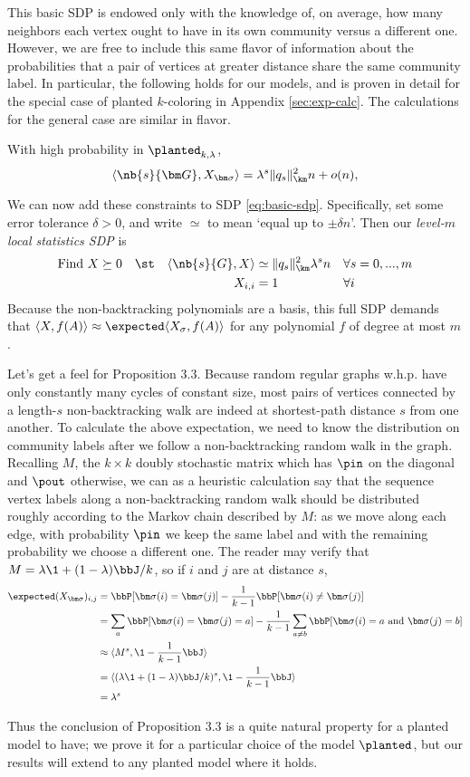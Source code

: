 This basic SDP is endowed only with the knowledge of, on average, how many neighbors each vertex ought to have in its own community versus a different one. However, we are free to include this same flavor of information about the probabilities that a pair of vertices at greater distance share the same community label. In particular, the following holds for our models, and is proven in detail for the special case of planted $k$-coloring in Appendix \ref{sec:exp-calc}.  The calculations for the general case are similar in flavor.
\begin{proposition} \label{prop:model}
    With high probability in $\planted_{k,\lambda}$, 
    $$
        \langle \nb{s}{\bm G},X_{\bm \sigma} \rangle = \lambda^s \|q_s\|^2_{\km} n + o(n),
    $$
\end{proposition}
We can now add these constraints to SDP \eqref{eq:basic-sdp}. Specifically, set some error tolerance $\delta>0$, and write $\simeq$ to mean `equal up to $\pm \delta n$'. Then our \emph{level-$m$ local statistics SDP} is
\begin{align} \label{eq:full-sdp}
    \text{Find  } X &\succeq 0 & &\st & \langle \nb{s}{G},X \rangle &\simeq \|q_s\|^2_{\km}\lambda^s n & & \forall s = 0,...,m \\
    & & & & X_{i,i} &= 1 & &\forall i \nonumber
\end{align}
Because the non-backtracking polynomials are a basis, this full SDP demands that $\langle X, f(A) \rangle \approx \expected\langle X_\sigma, f(A) \rangle$ for any polynomial $f$ of degree at most $m$.

Let's get a feel for Proposition 3.3. Because random regular graphs w.h.p. have only constantly many cycles of constant size, most pairs of vertices connected by a length-$s$ non-backtracking walk are indeed at shortest-path distance $s$ from one another. To calculate the above expectation, we need to know the distribution on community labels after we follow a non-backtracking random walk in the graph. Recalling $M$, the $k\times k$ doubly stochastic matrix which has $\pin$ on the diagonal and $\pout$ otherwise, we can as a heuristic calculation say that the sequence vertex labels along a non-backtracking random walk should be distributed roughly according to the Markov chain described by $M$: as we move along each edge, with probability $\pin$ we keep the same label and with the remaining probability we choose a different one. The reader may verify that $M = \lambda\1 + (1-\lambda)\bbJ/k$, so if $i$ and $j$ are at distance $s$,
\begin{align*}
    \expected (X_{\bm \sigma})_{i,j} 
    &= \bbP[\bm \sigma(i) = \bm \sigma(j)] - \frac{1}{k-1}\bbP[\bm \sigma(i) \neq \bm \sigma(j)] \\
    &= \sum_{a} \bbP[\bm \sigma(i) = \bm \sigma(j) = a] - \frac{1}{k-1}\sum_{a\neq b} \bbP[\bm \sigma(i) = a \text{ and } \bm \sigma(j) = b] \\
    &\approx \langle M^s, \1 - \frac{1}{k-1} \bbJ \rangle \\
    &= \langle(\lambda\1 + (1-\lambda)\bbJ/k)^s, \1 - \frac{1}{k-1} \bbJ\rangle \\
    &= \lambda^s
\end{align*}

\noindent Thus the conclusion of Proposition 3.3 is a quite natural property for a planted model to have; we prove it for a particular choice of the model $\planted$, but our results will extend to any planted model where it holds.